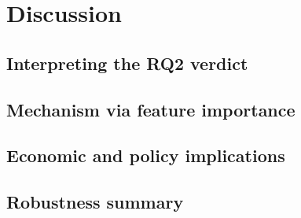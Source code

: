 \section{Discussion}\label{sec:discussion}

\subsection{Interpreting the RQ2 verdict}\label{sec:disc-rq2}

\subsection{Mechanism via feature importance}\label{sec:disc-mechanism}

\subsection{Economic and policy implications}\label{sec:disc-policy}

\subsection{Robustness summary}\label{sec:disc-robustness}
